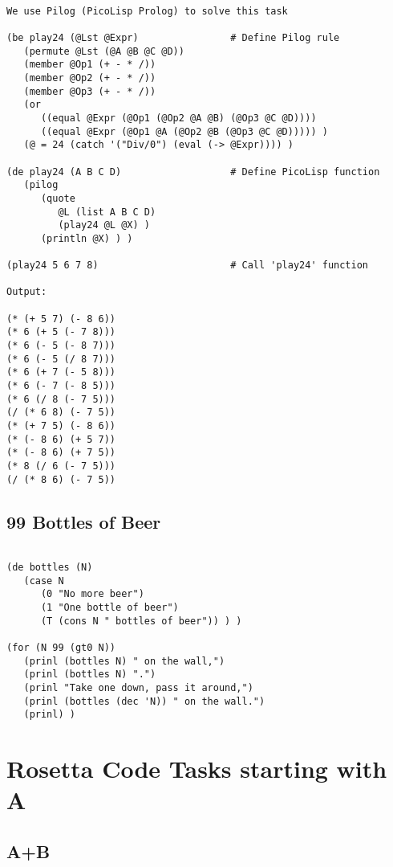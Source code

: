 \begin{verbatim}

We use Pilog (PicoLisp Prolog) to solve this task

(be play24 (@Lst @Expr)                # Define Pilog rule
   (permute @Lst (@A @B @C @D))
   (member @Op1 (+ - * /))
   (member @Op2 (+ - * /))
   (member @Op3 (+ - * /))
   (or
      ((equal @Expr (@Op1 (@Op2 @A @B) (@Op3 @C @D))))
      ((equal @Expr (@Op1 @A (@Op2 @B (@Op3 @C @D))))) )
   (@ = 24 (catch '("Div/0") (eval (-> @Expr)))) )

(de play24 (A B C D)                   # Define PicoLisp function
   (pilog
      (quote
         @L (list A B C D)
         (play24 @L @X) )
      (println @X) ) )

(play24 5 6 7 8)                       # Call 'play24' function

Output:

(* (+ 5 7) (- 8 6))
(* 6 (+ 5 (- 7 8)))
(* 6 (- 5 (- 8 7)))
(* 6 (- 5 (/ 8 7)))
(* 6 (+ 7 (- 5 8)))
(* 6 (- 7 (- 8 5)))
(* 6 (/ 8 (- 7 5)))
(/ (* 6 8) (- 7 5))
(* (+ 7 5) (- 8 6))
(* (- 8 6) (+ 5 7))
(* (- 8 6) (+ 7 5))
(* 8 (/ 6 (- 7 5)))
(/ (* 8 6) (- 7 5))

\end{verbatim}

\section*{99 Bottles of Beer}

\begin{verbatim}

(de bottles (N)
   (case N
      (0 "No more beer")
      (1 "One bottle of beer")
      (T (cons N " bottles of beer")) ) )

(for (N 99 (gt0 N))
   (prinl (bottles N) " on the wall,")
   (prinl (bottles N) ".")
   (prinl "Take one down, pass it around,")
   (prinl (bottles (dec 'N)) " on the wall.")
   (prinl) )

\end{verbatim}


\chapter{Rosetta Code Tasks starting with A}
\label{rosettacode-numbers}

\section*{A+B}

